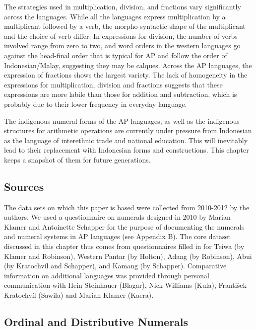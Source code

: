 \documentclass[output=paper]{LSP/langsci}
\begin{document}
The strategies used in multiplication, division, and fractions vary significantly across the languages. While all the languages express multiplication by a multiplicant followed by a verb, the morpho-syntactic shape of the multiplicant and the choice of verb differ. In expressions for division, the number of verbs involved range from zero to two, and word orders in the western languages go against the head-final order that is typical for AP and follow the order of Indonesian/Malay, suggesting they may be calques. Across the AP languages, the expression of fractions shows the largest variety. The lack of homogeneity in the expressions for multiplication, division and fractions suggests that these expressions are more labile than those for addition and subtraction, which is probably due to their lower frequency in everyday language.

The indigenous numeral forms of the AP languages, as well as the indigenous structures for arithmetic operations are currently under pressure from Indonesian as the language of interethnic trade and national education. This will inevitably lead to their replacement with Indonesian forms and constructions. This chapter keeps a snapshot of them for future generations. 

\subsection{Sources}
\label{sec:8:Sources}
The data sets on which this paper is based were collected from 2010-2012 by the authors. We used a questionnaire on numerals designed in 2010 by Marian Klamer and Antoinette Schapper for the purpose of documenting the numerals and numeral systems in AP languages (see Appendix B). The core dataset discussed in this chapter thus comes from questionnaires filled in for Teiwa (by Klamer and Robinson), Western Pantar (by Holton), Adang (by Robinson), Abui (by Kratochv\'il and Schapper), and Kamang (by Schapper). Comparative information on additional languages was provided through personal communication with Hein Steinhauer (Blagar), Nick Williams (Kula), Franti{\v{s}}ek Kratochv\'il (Sawila) and Marian Klamer (Kaera).

\startappendix
\subsection{Ordinal and Distributive Numerals} 
\end{document}
